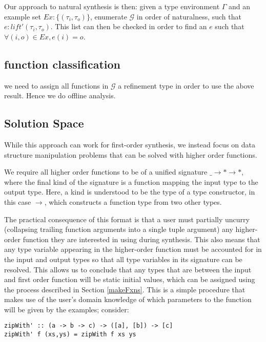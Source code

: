 Our approach to natural synthesis is then: given a type environment $\Gamma$ and an example set $Ex:\{(\tau_i,\tau_o)\}$, enumerate $\mathcal{G}$ in order of naturalness, such that $e : lift'(\tau_i,\tau_o)$.
This list can then be checked in order to find an $e$ such that $\forall (i,o) \in Ex, e (i) = o$.

\subsection{function classification}
we need to assign all functions in $\mathcal{G}$ a refinement type in order to use the above result.
Hence we do offline analysis.



%

\subsection{Solution Space}\label{solnSpace}
While this approach can work for first-order synthesis, we instead focus on data structure manipulation problems that can be solved with higher order functions.

We require all higher order functions to be of a unified signature \texttt{$\_ \to * \to *$}, where the final kind of the signature is a function mapping the input type to the output type. 
Here, a kind is understood to be the type of a type constructor, in this case \texttt{$\to$}, which constructs a function type from two other types.

The practical consequence of this format is that a user must partially uncurry (collapsing trailing function arguments into a single tuple argument) any higher-order function they are interested in using during synthesis.
This also means that any type variable appearing in the higher-order function must be accounted for in the input and output types so that all type variables in its signature can be resolved.
This allows us to conclude that any types that are between the input and first order function will be static initial values, which can be assigned using the process described in Section \ref{makeFxns}.
This is a simple procedure that makes use of the user's domain knowledge of which parameters to the function will be given by the examples; consider:

\begin{lstlisting}
zipWith' :: (a -> b -> c) -> ([a], [b]) -> [c]
zipWith' f (xs,ys) = zipWith f xs ys
\end{lstlisting}

